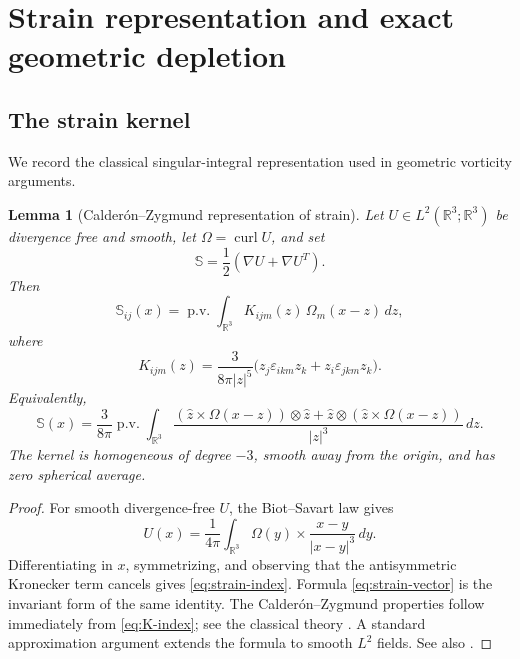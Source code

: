 \documentclass[11pt]{article}
\numberwithin{equation}{section}
\theoremstyle{plain}
\newtheorem{lemma}[theorem]{Lemma}
\theoremstyle{definition}
\theoremstyle{remark}
\DeclareMathOperator{\curl}{curl}
\newcommand{\R}{\mathbb R}
\newcommand{\pv}{\operatorname{p.v.}}
\begin{document}
\section{Strain representation and exact geometric depletion}\label{sec:geometry}

\subsection{The strain kernel}

We record the classical singular-integral representation used in geometric vorticity arguments.

\begin{lemma}[Calder\'on--Zygmund representation of strain]\label{lem:strain-kernel}
Let $U\in L^2(\R^3;\R^3)$ be divergence free and smooth, let $\Omega=\curl U$, and set
\[
\mathbb S=\frac12(\nabla U+\nabla U^T).
\]
Then
\begin{equation}\label{eq:strain-index}
\mathbb S_{ij}(x)
=
\pv\int_{\R^3}K_{ijm}(z)\,\Omega_m(x-z)\,dz,
\end{equation}
where
\begin{equation}\label{eq:K-index}
K_{ijm}(z)
=
\frac{3}{8\pi|z|^5}
\bigl(
 z_j\varepsilon_{ikm}z_k
+
 z_i\varepsilon_{jkm}z_k
\bigr).
\end{equation}
Equivalently,
\begin{equation}\label{eq:strain-vector}
\mathbb S(x)
=
\frac{3}{8\pi}\pv\int_{\R^3}
\frac{
(\widehat z\times\Omega(x-z))\otimes\widehat z
+
\widehat z\otimes(\widehat z\times\Omega(x-z))
}{|z|^3}\,dz.
\end{equation}
The kernel is homogeneous of degree $-3$, smooth away from the origin, and has zero spherical average.
\end{lemma}

\begin{proof}
For smooth divergence-free $U$, the Biot--Savart law gives
\[
U(x)=\frac1{4\pi}\int_{\R^3}
\Omega(y)\times\frac{x-y}{|x-y|^3}\,dy.
\]
Differentiating in $x$, symmetrizing, and observing that the antisymmetric Kronecker term cancels gives \eqref{eq:strain-index}. Formula \eqref{eq:strain-vector} is the invariant form of the same identity. The Calder\'on--Zygmund properties follow immediately from \eqref{eq:K-index}; see the classical theory \cite{CalderonZygmund1952}. A standard approximation argument extends the formula to smooth $L^2$ fields. See also \cite[Chapter 2]{MajdaBertozzi2002}.
\end{proof}
\end{document}
